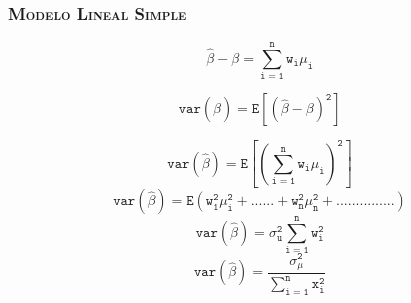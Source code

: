 \documentclass[16.5pt]{beamer}
\begin{document}
{
\begin{frame}
\frametitle{\textsc{Modelo Lineal Simple}}
\hspace*{-5mm}
\vspace*{-5mm} 


$$\mathtt{ \hat\beta - \beta = \sum_{i=1}^n w_i\mu_i}$$

$$\mathtt{ var(\hat\beta)= E[(\hat\beta-\beta)^2]} $$

$$\mathtt{ var(\hat\beta)= E[( \sum_{i=1}^n w_i\mu_i)^2]} $$
$$\mathtt{ var(\hat\beta)= E( w_1^2\mu_i^2 + ......+ w_n^2\mu_n^2 +...............)} $$
$$\mathtt{ var(\hat\beta)= \sigma^2_u \sum_{i=1}^n w_i^2} $$
$$\mathtt{ \boxed{var(\hat\beta)= \frac{\sigma_{\mu}^2}{\sum_{i=1}^n x_i^2}}} $$



\end{frame}
}
\end{document}
